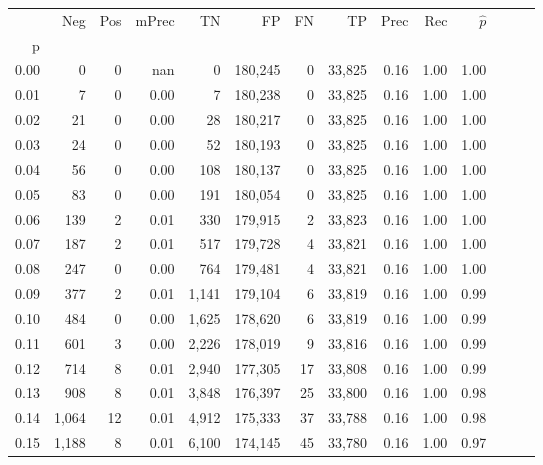 \begin{tabular}{rrrrrrrrrrrrrr}
\toprule
{} &    Neg &  Pos & mPrec &       TN &       FP &      FN &      TP &  Prec &   Rec & $\hat{p}$ \\
p    &        &      &       &          &          &         &         &       &       &           \\
\midrule
0.00 &      0 &    0 &   nan &        0 &  180,245 &       0 &  33,825 &  0.16 &  1.00 &      1.00 \\
0.01 &      7 &    0 &  0.00 &        7 &  180,238 &       0 &  33,825 &  0.16 &  1.00 &      1.00 \\
0.02 &     21 &    0 &  0.00 &       28 &  180,217 &       0 &  33,825 &  0.16 &  1.00 &      1.00 \\
0.03 &     24 &    0 &  0.00 &       52 &  180,193 &       0 &  33,825 &  0.16 &  1.00 &      1.00 \\
0.04 &     56 &    0 &  0.00 &      108 &  180,137 &       0 &  33,825 &  0.16 &  1.00 &      1.00 \\
0.05 &     83 &    0 &  0.00 &      191 &  180,054 &       0 &  33,825 &  0.16 &  1.00 &      1.00 \\
0.06 &    139 &    2 &  0.01 &      330 &  179,915 &       2 &  33,823 &  0.16 &  1.00 &      1.00 \\
0.07 &    187 &    2 &  0.01 &      517 &  179,728 &       4 &  33,821 &  0.16 &  1.00 &      1.00 \\
0.08 &    247 &    0 &  0.00 &      764 &  179,481 &       4 &  33,821 &  0.16 &  1.00 &      1.00 \\
0.09 &    377 &    2 &  0.01 &    1,141 &  179,104 &       6 &  33,819 &  0.16 &  1.00 &      0.99 \\
0.10 &    484 &    0 &  0.00 &    1,625 &  178,620 &       6 &  33,819 &  0.16 &  1.00 &      0.99 \\
0.11 &    601 &    3 &  0.00 &    2,226 &  178,019 &       9 &  33,816 &  0.16 &  1.00 &      0.99 \\
0.12 &    714 &    8 &  0.01 &    2,940 &  177,305 &      17 &  33,808 &  0.16 &  1.00 &      0.99 \\
0.13 &    908 &    8 &  0.01 &    3,848 &  176,397 &      25 &  33,800 &  0.16 &  1.00 &      0.98 \\
0.14 &  1,064 &   12 &  0.01 &    4,912 &  175,333 &      37 &  33,788 &  0.16 &  1.00 &      0.98 \\
0.15 &  1,188 &    8 &  0.01 &    6,100 &  174,145 &      45 &  33,780 &  0.16 &  1.00 &      0.97 \\

\end{tabular}
